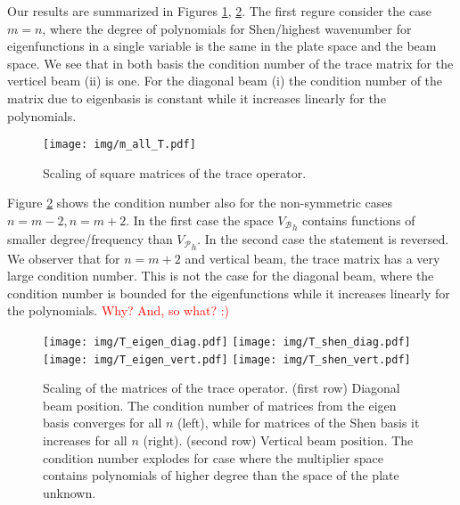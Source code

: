 \documentclass[a4paper,10pt]{article}
\newcommand{\Vp}{\ensuremath{V_{\mathcal{P}}}}
\newcommand{\Vb}{\ensuremath{V_{\mathcal{B}}}}
\newcommand{\TODO}[1]{\textcolor{red}{#1}}
\begin{document}
Our results are summarized in Figures {\ref{fig:trace_scaling_m}},
{\ref{fig:trace_scaling}}. The first regure consider the case $m=n$, where
the degree of polynomials for Shen/highest wavenumber for eigenfunctions in a
single variable is the same in the plate space and the beam space. We see that
in both basis the condition number of the trace matrix for the verticel beam
(ii) is one. For the diagonal beam (i) the condition number of the matrix
due to eigenbasis is constant while it increases linearly for the polynomials.
\begin{figure}
  \begin{center}
    \texttt{[image: img/m\_all\_T.pdf]}
    \caption{Scaling of square matrices of the trace operator.}
  \label{fig:trace_scaling_m}
  \end{center}
\end{figure}
Figure {\ref{fig:trace_scaling}} shows the condition number also for the
non-symmetric cases $n=m-2, n=m+2$. In the first case the space 
${\Vb}_h$ contains functions of smaller degree/frequency than ${\Vp}_h$. In the
second case the statement is reversed. We observer that for $n=m+2$ and
vertical beam, the trace matrix has a very large condition number. This is
not the case for the diagonal beam, where the condition number is bounded
for the eigenfunctions while it increases linearly for the polynomials.
\TODO{Why? And, so what? :)}
\begin{figure}
  \begin{center}
    \texttt{[image: img/T\_eigen\_diag.pdf]}
    \texttt{[image: img/T\_shen\_diag.pdf]}\\
    \texttt{[image: img/T\_eigen\_vert.pdf]}
    \texttt{[image: img/T\_shen\_vert.pdf]}\\
    \caption{Scaling of the matrices of the trace operator. (first row) 
    Diagonal beam position. The condition number of matrices from the eigen basis
    converges for all $n$ (left), while for matrices of the Shen basis it
    increases for all $n$ (right). (second row) Vertical beam position. The
    condition number explodes for case where the multiplier space contains
    polynomials of higher degree than the space of the plate unknown.
  }
  \label{fig:trace_scaling}
  \end{center}
\end{figure}



  \newpage
  
  
\end{document}
